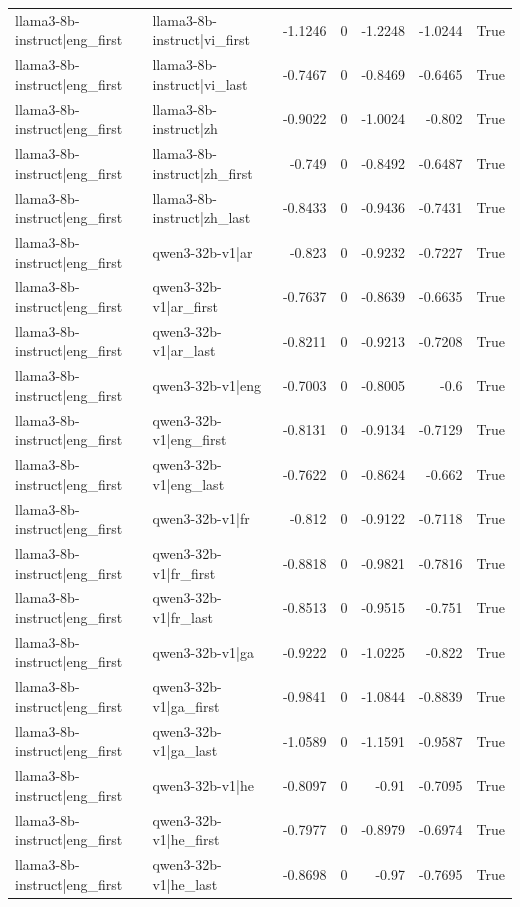 \begin{table}
\begin{tabular}{l l r r r r l}
llama3-8b-instruct|eng_first & llama3-8b-instruct|vi_first & -1.1246 & 0 & -1.2248 & -1.0244 & True \\
llama3-8b-instruct|eng_first & llama3-8b-instruct|vi_last & -0.7467 & 0 & -0.8469 & -0.6465 & True \\
llama3-8b-instruct|eng_first & llama3-8b-instruct|zh & -0.9022 & 0 & -1.0024 & -0.802 & True \\
llama3-8b-instruct|eng_first & llama3-8b-instruct|zh_first & -0.749 & 0 & -0.8492 & -0.6487 & True \\
llama3-8b-instruct|eng_first & llama3-8b-instruct|zh_last & -0.8433 & 0 & -0.9436 & -0.7431 & True \\
llama3-8b-instruct|eng_first & qwen3-32b-v1|ar & -0.823 & 0 & -0.9232 & -0.7227 & True \\
llama3-8b-instruct|eng_first & qwen3-32b-v1|ar_first & -0.7637 & 0 & -0.8639 & -0.6635 & True \\
llama3-8b-instruct|eng_first & qwen3-32b-v1|ar_last & -0.8211 & 0 & -0.9213 & -0.7208 & True \\
llama3-8b-instruct|eng_first & qwen3-32b-v1|eng & -0.7003 & 0 & -0.8005 & -0.6 & True \\
llama3-8b-instruct|eng_first & qwen3-32b-v1|eng_first & -0.8131 & 0 & -0.9134 & -0.7129 & True \\
llama3-8b-instruct|eng_first & qwen3-32b-v1|eng_last & -0.7622 & 0 & -0.8624 & -0.662 & True \\
llama3-8b-instruct|eng_first & qwen3-32b-v1|fr & -0.812 & 0 & -0.9122 & -0.7118 & True \\
llama3-8b-instruct|eng_first & qwen3-32b-v1|fr_first & -0.8818 & 0 & -0.9821 & -0.7816 & True \\
llama3-8b-instruct|eng_first & qwen3-32b-v1|fr_last & -0.8513 & 0 & -0.9515 & -0.751 & True \\
llama3-8b-instruct|eng_first & qwen3-32b-v1|ga & -0.9222 & 0 & -1.0225 & -0.822 & True \\
llama3-8b-instruct|eng_first & qwen3-32b-v1|ga_first & -0.9841 & 0 & -1.0844 & -0.8839 & True \\
llama3-8b-instruct|eng_first & qwen3-32b-v1|ga_last & -1.0589 & 0 & -1.1591 & -0.9587 & True \\
llama3-8b-instruct|eng_first & qwen3-32b-v1|he & -0.8097 & 0 & -0.91 & -0.7095 & True \\
llama3-8b-instruct|eng_first & qwen3-32b-v1|he_first & -0.7977 & 0 & -0.8979 & -0.6974 & True \\
llama3-8b-instruct|eng_first & qwen3-32b-v1|he_last & -0.8698 & 0 & -0.97 & -0.7695 & True \\

\end{tabular}
\end{table}
